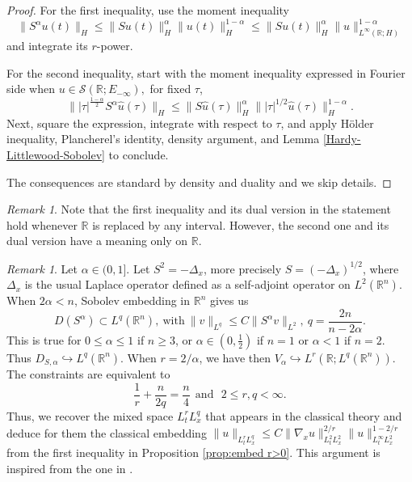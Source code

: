 \documentclass[11pt, letterpaper]{amsart}
\theoremstyle{definition}
\theoremstyle{remark}
\newtheorem{rem}[thm]{Remark}
\numberwithin{equation}{section}
\begin{document}
{\begin{proof} 
    For the first inequality, use the moment inequality
    $$\|S^\alpha u(t)\|_H\le \|Su(t)\|_H^\alpha \|u(t)\|_H^{1-\alpha}\le \|Su(t)\|_H^\alpha \|u \|_{L^\infty(\mathbb{R};H)}^{1-\alpha} $$
    and integrate its $r$-power.
    
    For the second inequality, start with the moment inequality expressed in Fourier side when $u\in  \mathcal{S}(\mathbb{R};E_{-\infty}),$ for fixed $\tau$,
    $$\||\tau|^{\frac{1-\alpha}{2}}S^\alpha \hat u(\tau)\|_H\le \|S \hat u(\tau)\|_H^\alpha \||\tau|^{{1}/{2}}\hat u(\tau)\|_H^{1-\alpha}.$$
    Next, square the expression, integrate with respect to $\tau$, and apply H\"older inequality, Plancherel’s identity, density argument, and Lemma \ref{Hardy-Littlewood-Sobolev} to conclude.

    The consequences are standard by density and duality and we skip details.
\end{proof}

\begin{rem}
Note that the first inequality and its dual version in the statement hold whenever $\mathbb{R}$ is replaced by any interval. However, the second one and its dual version have a meaning only on  $\mathbb{R}$.
\end{rem}
\begin{rem}
Let $\alpha \in (0,1]$. Let $S^2=-\Delta_x$,  more precisely $S=(-\Delta_x)^{1/2}$, where $\Delta_x$ is the usual Laplace operator  defined as a self-adjoint operator on $L^2(\mathbb{R}^n)$.  
When $2\alpha < n$,  
Sobolev embedding in $\mathbb{R}^n$ gives us  
$$D(S^\alpha)\subset L^q(\mathbb{R}^n), \ \mathrm{with}\  \|v\|_{L^q} \le C \|S^\alpha v\|_{L^2}, \ q=\frac{2n}{n-2\alpha}.$$
 This is true for  $0\le \alpha\le 1$ if $n \geq 3$,  or $\alpha \in (0,\frac{1}{2})$ if $n=1$ or $\alpha<1$ if $n=2$.  Thus $D_{S,\alpha} \hookrightarrow L^q(\mathbb{R}^n)$. When $r=2/\alpha$, we have then $ V_\alpha \hookrightarrow L^r(\mathbb{R};L^q(\mathbb{R}^n))$. The constraints are equivalent to 
 $$ \frac{1}{r}+\frac{n}{2q}=\frac{n}{4} \ \ \mathrm{and} \ \ \ 2 \leq r,q < \infty.$$
Thus, we recover the mixed space $L^r_t L^q_x$ that appears in the classical theory \cite[chp.~3]{ladyzhenskaia1968linear} and deduce for them the classical embedding $\|u\|_{L^r_tL^q_x}\le C \|\nabla_x u\|_{L^2_tL^2_x}^{{2}/{r}} \|u\|_{L^\infty_tL^2_x}^{1-{2}/{r}} $ from the first inequality in  Proposition \ref{prop:embed r>0}. This argument  is inspired from the one in \cite{auscher2023universal}.
\end{rem}

}
\end{document}
